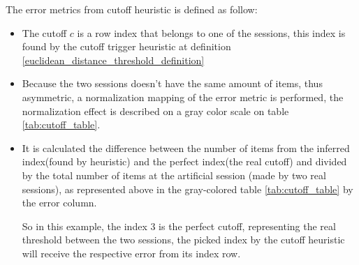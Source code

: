 \documentclass[ecp,tc,english]{iiufrgs}
\begin{document}
    
    The error metrics from cutoff heuristic is defined as follow:
    
        
        \begin{itemize}
            \item The cutoff \(c\) is a row index that belongs to one of the sessions, this index is found by the cutoff trigger heuristic at definition \ref{euclidean_distance_threshold_definition}
            \item Because the two sessions doesn't have the same amount of items, thus asymmetric, a normalization mapping of the error metric is performed, the normalization effect is described on a gray color scale on table \ref{tab:cutoff_table}.
            \item It is calculated the difference between the number of items from the inferred index(found by heuristic) and the perfect index(the real cutoff) and divided by the total number of items at the artificial session (made by two real sessions), as represented above in the gray-colored table \ref{tab:cutoff_table} by the error column.
            
            So in this example, the index 3 is the perfect cutoff, representing the real threshold between the two sessions, the picked index by the cutoff heuristic will receive the respective error from its index row.
        \end{itemize} 
        
\end{document}
